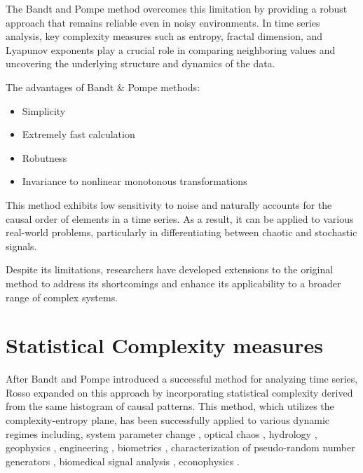 The Bandt and Pompe method overcomes this limitation by providing a robust approach that remains reliable even in noisy environments. In time series analysis, key complexity measures such as entropy, fractal dimension, and Lyapunov exponents play a crucial role in comparing neighboring values and uncovering the underlying structure and dynamics of the data.

The advantages of Bandt \& Pompe methods:
\begin{itemize}
	\item Simplicity
	\item Extremely fast calculation
	\item Robutness
	\item Invariance to nonlinear monotonous transformations
\end{itemize}	

This method exhibits low sensitivity to noise and naturally accounts for the causal order of elements in a time series. As a result, it can be applied to various real-world problems, particularly in differentiating between chaotic and stochastic signals.

Despite its limitations, researchers have developed extensions to the original method to address its shortcomings and enhance its applicability to a broader range of complex systems.

\section*{Statistical Complexity measures}

After Bandt and Pompe introduced a successful method for analyzing time series, Rosso \cite{Rosso2007} expanded on this approach by incorporating statistical complexity derived from the same histogram of causal patterns. This method, which utilizes the complexity-entropy plane, has been successfully applied to various dynamic regimes including, system parameter change \cite{Cao2004,Bandt2005,Kowalski2007,Zunino2010a,Rosso2010a,Kowalski2011b,Zunino2012a, DeMicco2012a}, optical chaos \cite{Soriano2011a,Zunino2011a,Toomey2014,Yang2015e,Liu2016f}, hydrology \cite{Lange2013,Serinaldi2014,Stosic2016}, geophysics \cite{Consolini2014,Saco2010,Sippel2016}, engineering \cite{Yan2012,Aquino2015,Aquino2017,Redelico2017a}, biometrics \cite{Rosso2016}, characterization of pseudo-random number generators \cite{DeMicco2008,DeMicco2009}, biomedical signal analysis \cite{Zanin2012,Li2007,Li2008b,Parlitz2012,Morabito2012,Li2014b,Montani2014,Montani2014a,Liang2015b,Montani2015a,Montani2015}, econophysics \cite{Zanin2012,Zunino2010,Zunino2009, Bariviera2015a,Bariviera2015,Bariviera2016,Zunino2016a}.

